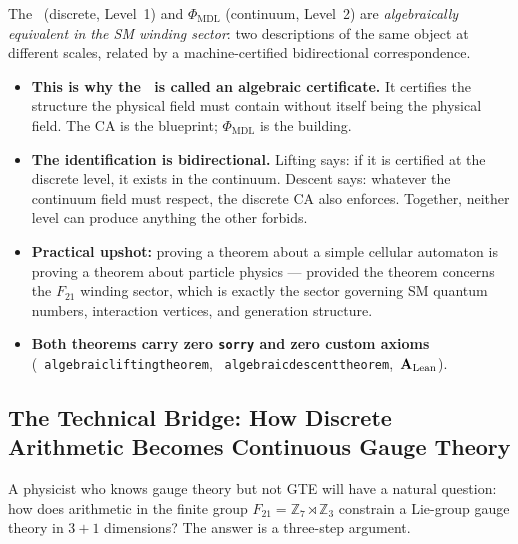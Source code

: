\documentclass[11pt,openany]{book}
\theoremstyle{remark}
\newcommand{\PHIMDL}{\Phi_{\mathrm{MDL}}}
\newcommand{\ZS}{\mathbb{Z}_7}
\newcommand{\lean}[1]{%
  \penalty-100
  \begingroup\def\_{\textunderscore\allowbreak}\texttt{#1}\endgroup}
\newcommand{\CMCA}{\text{CMCA}}
\newcommand{\CatAL}{\ensuremath{\textbf{A}_{\rm Lean}}}
\begin{document}
\begin{tcolorbox}[colback=blue!3,colframe=blue!45!black,
  title={What the Two Theorems Mean Together},
  fonttitle=\small\bfseries, left=8pt, right=8pt, top=5pt, bottom=5pt]
The \CMCA\ (discrete, Level~1) and $\PHIMDL$ (continuum, Level~2) are
\emph{algebraically equivalent in the SM winding sector}: two descriptions
of the same object at different scales, related by a machine-certified
bidirectional correspondence.

\begin{itemize}[leftmargin=1.2em, itemsep=2pt, topsep=3pt]
\item \textbf{This is why the \CMCA\ is called an algebraic certificate.}
  It certifies the structure the physical field must contain without itself
  being the physical field.  The CA is the blueprint; $\PHIMDL$ is the building.

\item \textbf{The identification is bidirectional.}  Lifting says: if it is
  certified at the discrete level, it exists in the continuum.  Descent says:
  whatever the continuum field must respect, the discrete CA also enforces.
  Together, neither level can produce anything the other forbids.

\item \textbf{Practical upshot:} proving a theorem about a simple
  cellular automaton is proving a theorem about particle physics --- provided
  the theorem concerns the $F_{21}$ winding sector, which is exactly the
  sector governing SM quantum numbers, interaction vertices, and generation
  structure.

\item \textbf{Both theorems carry zero \texttt{sorry} and zero custom axioms}
  \mbox{(\lean{algebraic\_lifting\_theorem},}
  \mbox{\lean{algebraic\_descent\_theorem}, \CatAL)}.
\end{itemize}
\end{tcolorbox}

\subsection*{The Technical Bridge: How Discrete Arithmetic Becomes Continuous Gauge Theory}
\label{subsec:technical_bridge}

A physicist who knows gauge theory but not GTE will have a natural question: how does
arithmetic in the finite group $F_{21} = \ZS\rtimes\mathbb{Z}_3$ constrain a Lie-group
gauge theory in $3{+}1$ dimensions?  The answer is a three-step argument.
\end{document}
